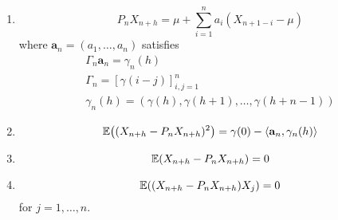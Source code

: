 \begin{thm}
  \label{defn:stationary_processes:1}
  \begin{enumerate}
  \item
    \begin{equation}
      P_{n}X_{n+h} = \mu + \sum_{i=1}^{n} a_{i} (X_{n+1-i} - \mu)
    \end{equation} where $\mathbf{a}_{n} = (a_{1}, \dots, a_{n})$ satisfies
    \begin{align}
      \Gamma_{n} \mathbf{a}_{n} = \gamma_{n}(h) \\
      \Gamma_{n} = [\gamma(i - j)]^{n}_{i,j = 1} \\
      \gamma_{n}(h) = (\gamma(h), \gamma(h+1), \dots, \gamma(h + n - 1))
    \end{align}
  \item
    \begin{equation}
      \E{(X_{n+h} - P_{n} X_{n+h})^{2}} = \gamma(0) -
      \IP{\mathbf{a}_{n}, \gamma_{n}(h)}
    \end{equation}
  \item
    \begin{equation}
      \E{X_{n+h} - P_{n} X_{n+h}} = 0
    \end{equation}
  \item
    \begin{equation}
      \E{(X_{n+h} - P_{n} X_{n+h}) X_{j}} = 0
    \end{equation} for $j = 1, \dots, n$.
  \end{enumerate}
\end{thm}

